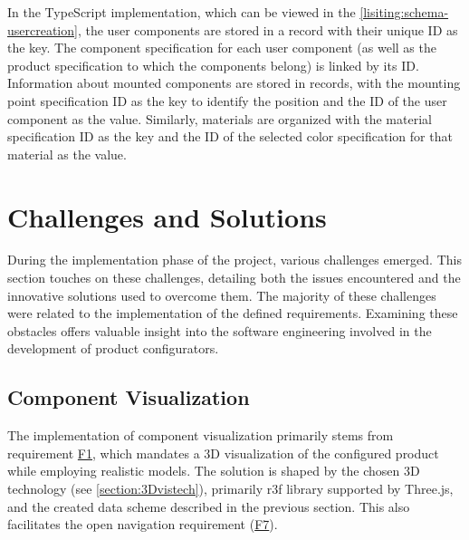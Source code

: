 In the TypeScript implementation, which can be viewed in the \autoref{lisiting:schema-usercreation}, the user components are stored in a record with their unique ID as the key. The component specification for each user component (as well as the product specification to which the components belong) is linked by its ID. Information about mounted components are stored in records, with the mounting point specification ID as the key to identify the position and the ID of the user component as the value. Similarly, materials are organized with the material specification ID as the key and the ID of the selected color specification for that material as the value.


\section{Challenges and Solutions}

During the implementation phase of the project, various challenges emerged. This section touches on these challenges, detailing both the issues encountered and the innovative solutions used to overcome them. The majority of these challenges were related to the implementation of the defined requirements. Examining these obstacles offers valuable insight into the software engineering involved in the development of product configurators.


\subsection{Component Visualization}

The implementation of component visualization primarily stems from requirement \hyperref[itm:F1]{F1}, which mandates a 3D visualization of the configured product while employing realistic models. The solution is shaped by the chosen 3D technology (see \autoref{section:3Dvistech}), primarily \acrlong{r3f} library supported by Three.js, and the created data scheme described in the previous section. This also facilitates the open navigation requirement (\hyperref[itm:F7]{F7}).

